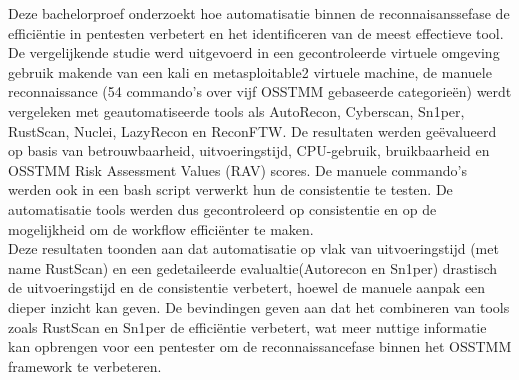 Deze bachelorproef onderzoekt hoe automatisatie binnen de reconnaisanssefase de efficiëntie in pentesten verbetert en het identificeren van de meest effectieve tool.
De vergelijkende studie werd uitgevoerd in een gecontroleerde virtuele omgeving gebruik makende van een kali en metasploitable2 virtuele machine, de manuele reconnaissance (54 commando's over vijf OSSTMM gebaseerde categorieën) werdt vergeleken met geautomatiseerde tools als AutoRecon, Cyberscan, Sn1per, RustScan, Nuclei, LazyRecon en ReconFTW.
De resultaten werden geëvalueerd op basis van betrouwbaarheid, uitvoeringstijd, CPU-gebruik, bruikbaarheid en OSSTMM Risk Assessment Values (RAV) scores.
De manuele commando's werden ook in een bash script verwerkt hun de consistentie te testen. De automatisatie tools werden dus gecontroleerd op consistentie en op de mogelijkheid om de workflow efficiënter te maken.\\


Deze resultaten toonden aan dat automatisatie op vlak van uitvoeringstijd (met name RustScan) en een gedetaileerde evalualtie(Autorecon en Sn1per)
drastisch de uitvoeringstijd en de consistentie verbetert, hoewel de manuele aanpak een dieper inzicht kan geven.
De bevindingen geven aan dat het combineren van tools zoals RustScan en Sn1per de efficiëntie verbetert, wat meer nuttige informatie kan opbrengen voor een pentester om de reconnaissancefase binnen het OSSTMM framework te verbeteren.
